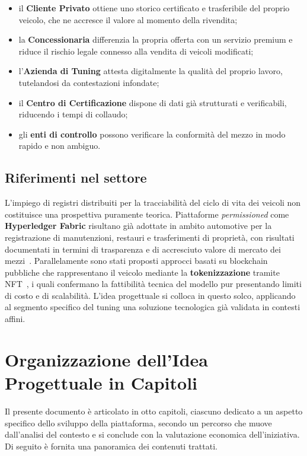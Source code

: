 \begin{itemize}
    \item il \textbf{Cliente Privato} ottiene uno storico certificato e trasferibile del proprio veicolo, che ne accresce il valore al momento della rivendita;
    \item la \textbf{Concessionaria} differenzia la propria offerta con un servizio premium e riduce il rischio legale connesso alla vendita di veicoli modificati;
    \item l'\textbf{Azienda di Tuning} attesta digitalmente la qualit\`a del proprio lavoro, tutelandosi da contestazioni infondate;
    \item il \textbf{Centro di Certificazione} dispone di dati gi\`a strutturati e verificabili, riducendo i tempi di collaudo;
    \item gli \textbf{enti di controllo} possono verificare la conformit\`a del mezzo in modo rapido e non ambiguo.
\end{itemize}

\subsection*{Riferimenti nel settore}

L'impiego di registri distribuiti per la tracciabilit\`a del ciclo di vita dei veicoli non costituisce una prospettiva puramente teorica. Piattaforme \textit{permissioned} come \textbf{Hyperledger Fabric} risultano gi\`a adottate in ambito automotive per la registrazione di manutenzioni, restauri e trasferimenti di propriet\`a, con risultati documentati in termini di trasparenza e di accresciuto valore di mercato dei mezzi~\cite{hyperledger,murta2024}. Parallelamente sono stati proposti approcci basati su blockchain pubbliche che rappresentano il veicolo mediante la \textbf{tokenizzazione} tramite NFT~\cite{nftvehicle}, i quali confermano la fattibilit\`a tecnica del modello pur presentando limiti di costo e di scalabilit\`a. L'idea progettuale si colloca in questo solco, applicando al segmento specifico del tuning una soluzione tecnologica gi\`a validata in contesti affini.

\section{Organizzazione dell'Idea Progettuale in Capitoli}

Il presente documento \`e articolato in otto capitoli, ciascuno dedicato a un aspetto specifico dello sviluppo della piattaforma, secondo un percorso che muove dall'analisi del contesto e si conclude con la valutazione economica dell'iniziativa. Di seguito \`e fornita una panoramica dei contenuti trattati.

